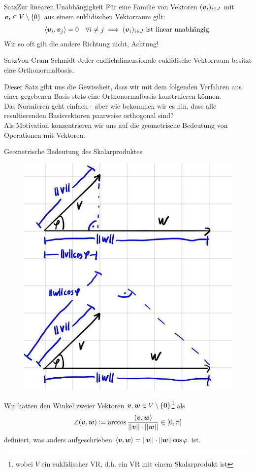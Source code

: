 \begin{Satz}
{Satz}{Zur linearen Unabhängigkeit}
Für eine Familie von Vektoren $({{\text{\boldmath${v}$}}}_i)_{i\in J}$ mit ${{\text{\boldmath${v}$}}}_i\in V\setminus\left\{0\right\}$ aus einem euklidischen Vektorraum gilt:
\begin{equation*}
	\left\langle{{\text{\boldmath${v}$}}}_i,{{\text{\boldmath${v}$}}}_j\right\rangle=0\quad\forall i\neq j\implies ({{\text{\boldmath${v}$}}}_i)_{i\in J} \text{ ist linear unabhängig}.
\end{equation*}
Wir so oft gilt die andere Richtung nicht, Achtung!
\end{Satz}
\begin{Satz}{Satz}{Von Gram-Schmidt}
Jeder endlichdimensionale euklidische Vektorraum besitzt eine Orthonormalbasis.\\
\end{Satz}
Dieser Satz gibt uns die Gewissheit, dass wir mit dem folgenden Verfahren aus einer gegebenen Basis stets eine Orthonormalbasis konstruieren können.\\
Das Normieren geht einfach - aber wie bekommen wir es hin, dass alle resultierenden Basisvektoren paarweise orthogonal sind?\\
Als Motivation konzentrieren wir uns auf die geometrische Bedeutung von Operationen mit Vektoren.
\begin{Wiederholung}
{Geometrische Bedeutung des Skalarproduktes}
\begin{figure}
 \vspace{-15pt}
\includegraphics[width=.25\textwidth]{Dateien/04/04Skalarprodukt.jpg}
 \vspace{-15pt}
\end{figure}
Wir hatten den Winkel zweier Vektoren ${{\text{\boldmath${v}$}}},{{\text{\boldmath${w}$}}}\in V\setminus\left\{{\text{\boldmath${0}$}}\right\}$\footnote{wobei $V$ ein euklidischer VR, d.h. ein VR mit einem Skalarprodukt ist} als
\begin{equation*}
    \angle({{\text{\boldmath${v}$}}},{{\text{\boldmath${w}$}}}):=\arccos\frac{\left\langle{{\text{\boldmath${v}$}}},{{\text{\boldmath${w}$}}}\right\rangle}{\left|\left|{{\text{\boldmath${v}$}}}\right|\right|\cdot\left|\left|{{\text{\boldmath${w}$}}}\right|\right|}\in[0,\pi]
\end{equation*}
definiert, was anders aufgeschrieben $\left\langle{{\text{\boldmath${v}$}}},{{\text{\boldmath${w}$}}}\right\rangle=\left|\left|{{\text{\boldmath${v}$}}}\right|\right|\cdot\left|\left|{{\text{\boldmath${w}$}}}\right|\right|\cos\varphi$ ist.\\
\end{Wiederholung}
